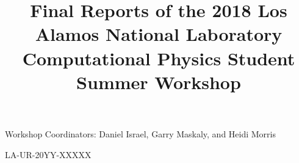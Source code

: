 \documentclass[12pt]{report}
\title{Final Reports of the 2018 Los Alamos National Laboratory
  Computational Physics Student Summer Workshop}
\author{}
\begin{document}

\begin{titlepage}
\makeatletter
\centering 


\vspace{1em}
{\LARGE\bfseries\@title}
\vspace{1em}


\vfill

Workshop Coordinators: Daniel Israel, Garry Maskaly, and Heidi Morris

LA-UR-20YY-XXXXX 
\makeatother
\end{titlepage}

\tableofcontents

%

%  

\end{document}
